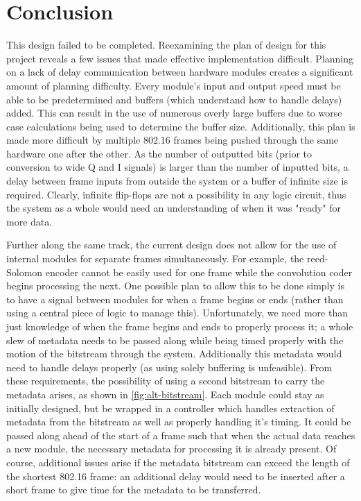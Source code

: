 \section{Conclusion}

This design failed to be completed. Reexamining the plan of design for this project reveals a few issues that made effective implementation difficult. Planning on a lack of delay communication between hardware modules creates a significant amount of planning difficulty. Every module's input and output speed must be able to be predetermined and buffers (which understand how to handle delays) added. This can result in the use of numerous overly large buffers due to worse case calculations being used to determine the buffer size. Additionally, this plan is made more difficult by multiple 802.16 frames being pushed through the same hardware one after the other. As the number of outputted bits (prior to conversion to wide Q and I signals) is larger than the number of inputted bits, a delay between frame inputs from outside the system or a buffer of infinite size is required. Clearly, infinite flip-flops are not a possibility in any logic circuit, thus the system as a whole would need an understanding of when it was "ready" for more data.

Further along the same track, the current design does not allow for the use of internal modules for separate frames simultaneously. For example, the reed-Solomon encoder cannot be easily used for one frame while the convolution coder begins processing the next. One possible plan to allow this to be done simply is to have a signal between modules for when a frame begins or ends (rather than using a central piece of logic to manage this). Unfortunately, we need more than just knowledge of when the frame begins and ends to properly process it; a whole slew of metadata needs to be passed along while being timed properly with the motion of the bitstream through the system. Additionally this metadata would need to handle delays properly (as using solely buffering is unfeasible). From these requirements, the possibility of using a second bitstream to carry the metadata arises, as shown in \autoref{fig:alt-bitstream}. Each module could stay as initially designed, but be wrapped in a controller which handles extraction of metadata from the bitstream as well as properly handling it's timing. It could be passed along ahead of the start of a frame such that when the actual data reaches a new module, the necessary metadata for processing it is already present. Of course, additional issues arise if the metadata bitstream can exceed the length of the shortest 802.16 frame: an additional delay would need to be inserted after a short frame to give time for the metadata to be transferred.

